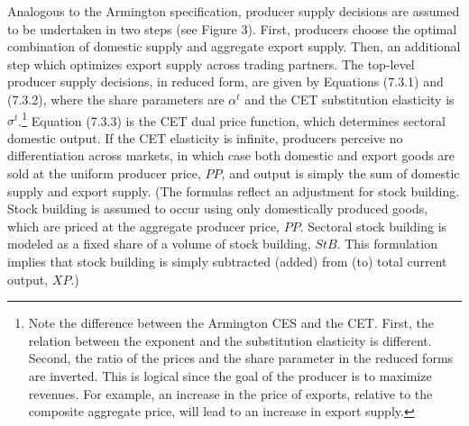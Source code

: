 \documentclass{article}
\begin{document}
Analogous to the Armington specification, producer supply decisions are assumed to be undertaken in two steps (see Figure 3). First, producers choose the optimal combination of domestic supply and aggregate export supply. Then, an additional step which optimizes export supply across trading partners. The top-level producer supply decisions, in reduced form, are given by Equations (7.3.1) and (7.3.2), where the share parameters are $\alpha^t$ and the CET substitution elasticity is $\sigma^t$.\footnote{Note the difference between the Armington CES and the CET.  First, the relation between the exponent and the substitution elasticity is different.  Second, the ratio of the prices and the share parameter in the reduced forms are inverted.  This is logical since the goal of the producer is to maximize revenues.  For example, an increase in the price of exports, relative to the composite aggregate price, will lead to an increase in export supply.} Equation (7.3.3) is the CET dual price function, which determines sectoral domestic output. If the CET elasticity is infinite, producers perceive no differentiation across markets, in which case both domestic and export goods are sold at the uniform producer price, $PP$, and output is simply the sum of domestic supply and export supply. (The formulas reflect an adjustment for stock building. Stock building is assumed to occur using only domestically produced goods, which are priced at the aggregate producer price, $PP$. Sectoral stock building is modeled as a fixed share of a volume of stock building, $StB$. This formulation implies that stock building is simply subtracted (added) from (to) total current output, $XP$.)
\end{document}
